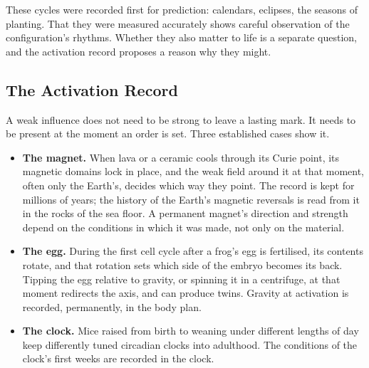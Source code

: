 \documentclass[11pt,a4paper]{article}
\begin{document}
These cycles were recorded first for prediction: calendars, eclipses, the seasons of planting. That they were measured accurately shows careful observation of the configuration's rhythms. Whether they also matter to life is a separate question, and the activation record proposes a reason why they might.

\subsection*{The Activation Record}

A weak influence does not need to be strong to leave a lasting mark. It needs to be present at the moment an order is set. Three established cases show it.
\begin{itemize}
    \item \textbf{The magnet.} When lava or a ceramic cools through its Curie point, its magnetic domains lock in place, and the weak field around it at that moment, often only the Earth's, decides which way they point. The record is kept for millions of years; the history of the Earth's magnetic reversals is read from it in the rocks of the sea floor. A permanent magnet's direction and strength depend on the conditions in which it was made, not only on the material.
    \item \textbf{The egg.} During the first cell cycle after a frog's egg is fertilised, its contents rotate, and that rotation sets which side of the embryo becomes its back. Tipping the egg relative to gravity, or spinning it in a centrifuge, at that moment redirects the axis, and can produce twins. Gravity at activation is recorded, permanently, in the body plan.
    \item \textbf{The clock.} Mice raised from birth to weaning under different lengths of day keep differently tuned circadian clocks into adulthood. The conditions of the clock's first weeks are recorded in the clock.
\end{itemize}
\end{document}
